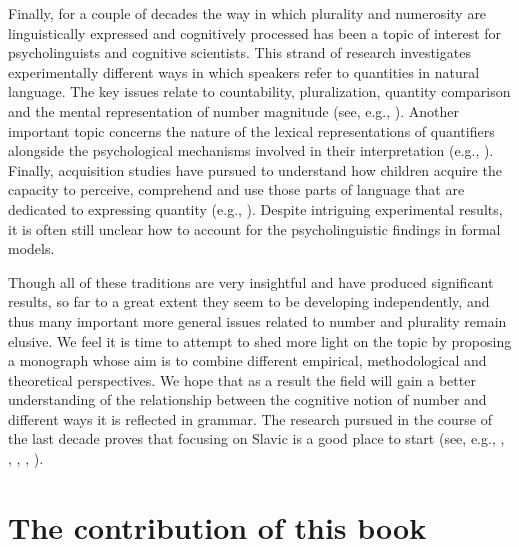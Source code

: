 \documentclass[output=paper]{langscibook}
\begin{document}
Finally, for a couple of decades the way in which plurality and numerosity are linguistically expressed and cognitively processed has been a topic of interest for psycholinguists and cognitive scientists. This strand of research investigates experimentally different ways in which speakers refer to quantities in natural language. The key issues relate to countability, pluralization, quantity comparison and the mental representation of number magnitude (see, e.g., \citealt{henik1982three, shipley_shepperson1990countable, dehaene1993mental, barner_snedeker2005quantity, melgoza_pogue_barner2008broken}). Another important topic concerns the nature of the lexical representations of quantifiers alongside the psychological mechanisms involved in their interpretation (e.g., \citealt{pietroski2009meaning, lidz_et-al2011interface}). Finally, acquisition studies have pursued to understand how children acquire the capacity to perceive, comprehend and use those parts of language that are dedicated to expressing quantity (e.g., \citealt{noveck2001children, papafragou2004children}). Despite intriguing experimental results, it is often still unclear how to account for the psycholinguistic findings in formal models.

Though all of these traditions are very insightful and have produced significant results, so far to a great extent they seem to be developing independently, and thus many important more general issues related to number and plurality remain elusive. We feel it is time to attempt to shed more light on the topic by proposing a monograph whose aim is to combine different empirical, methodological and theoretical perspectives. We hope that as a result the field will gain a better understanding of the relationship between the cognitive notion of number and different ways it is reflected in grammar. The research pursued in the course of the last decade proves that focusing on Slavic is a good place to start (see, e.g., \citealt{docekal2012atoms}, \citealt{wagiel2015sums}, \citealt{matushansky2015}, \citealt{khrizman2016functional}, \citealt{arsenijevic2017gender}).

\section{The contribution of this book}\label{doc-wag:sec:the-contribution-of-this-book}
\end{document}
